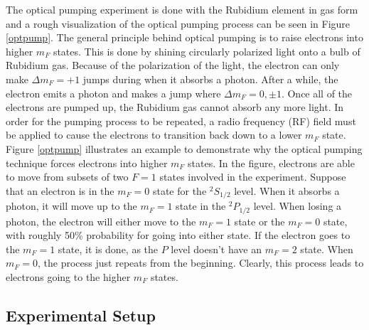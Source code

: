 \documentclass[11pt,letterpaper]{article}
\begin{document}
The optical pumping experiment is done with the Rubidium element in gas form
and a rough visualization of the optical pumping process can be seen in Figure
\ref{optpump}. The general principle behind optical pumping is to raise
electrons into higher $m_F$ states. This is done by shining circularly polarized
light onto a bulb of Rubidium gas. Because of the polarization of the light, the
electron can only make $\Delta m_F = +1$ jumps during when it absorbs a photon.
After a while, the electron emits a photon and makes a jump where $\Delta m_F =
0, \pm 1$. Once all of the electrons are pumped up, the Rubidium gas cannot
absorb any more light. In order for the pumping process to be repeated, a radio
frequency (RF) field must be applied to cause the electrons to transition back
down to a lower $m_F$ state.\\

Figure \ref{optpump} illustrates an example to demonstrate why the optical
pumping technique forces electrons into higher $m_F$ states. In the figure,
electrons are able to move from subsets of two $F = 1$ states involved in the
experiment. Suppose that an electron is in the $m_F = 0$ state for the
$^2S_{1/2}$ level. When it absorbs a photon, it will move up to the $m_F = 1$
state in the $^2P_{1/2}$ level. When losing a photon, the electron will either
move to the $m_F = 1$ state or the $m_F = 0$ state, with roughly 50\%
probability for going into either state. If the electron goes to the $m_F = 1$
state, it is done, as the $P$ level doesn't have an $m_F = 2$ state. When $m_F =
0$, the process just repeats from the beginning. Clearly, this process leads to
electrons going to the higher $m_F$ states.

\subsection{Experimental Setup}
\end{document}
